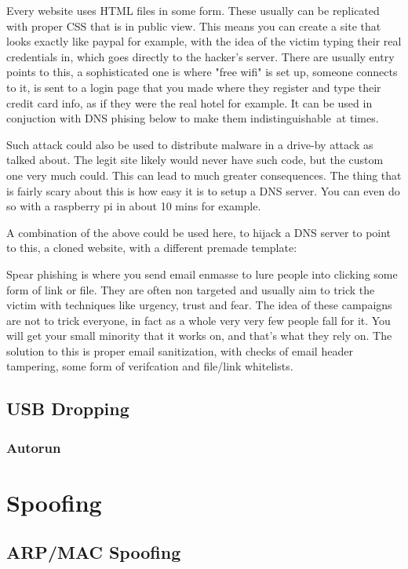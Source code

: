 Every website uses HTML files in some form. These usually can be replicated with proper CSS that is in public view. This means you can create a site that looks exactly like paypal for example, with the idea of the victim typing their real credentials in, 
which goes directly to the hacker's server. There are usually entry points to this, a sophisticated one is where "free wifi" is set up, someone connects to it, is sent to a login page that you made where they register and type their credit card info, 
as if they were the real hotel for example. It can be used in conjuction with DNS phising below to make them indistinguishable at times.

Such attack could also be used to distribute malware in a drive-by attack as talked about. The legit site likely would never have such code, but the custom one very much could. This can lead to much greater consequences. The thing that is fairly scary about this is how easy it is to setup a DNS server. You can even do so with a raspberry pi in about 10 mins for example.

A combination of the above could be used here, to hijack a DNS server to point to this, a cloned website, with a different premade template:

Spear phishing is where you send email enmasse to lure people into clicking some form of link or file. They are often non targeted and usually aim to trick the victim with techniques like urgency, trust and fear. The idea of these campaigns are not to trick everyone, 
in fact as a whole very very few people fall for it. You will get your small minority that it works on, and that's what they rely on. The solution to this is proper email sanitization, with checks of email header tampering, some form of verifcation and file/link whitelists.

\subsection{USB Dropping}
\subsubsection{Autorun}
\section{Spoofing}
\subsection{ARP/MAC Spoofing}

